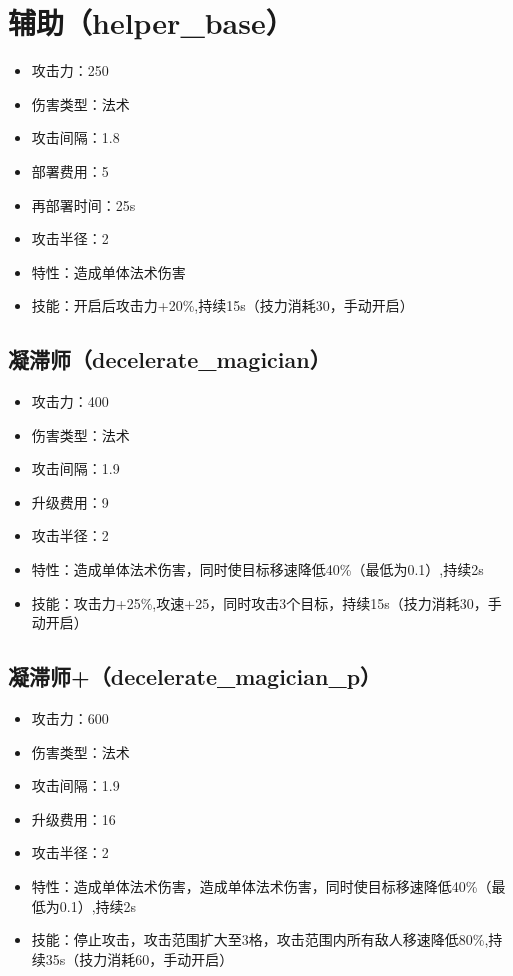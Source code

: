 \documentclass[a4paper,12pt]{article}
\begin{document}
	\section{辅助（helper\_base）}
		\begin{itemize}
			\item 攻击力：250
			\item 伤害类型：法术
			\item 攻击间隔：1.8
			\item 部署费用：5
			\item 再部署时间：25s
			\item 攻击半径：2
			\item 特性：造成单体法术伤害
			\item 技能：开启后攻击力+20\%,持续15s（技力消耗30，手动开启）
		\end{itemize}
		\subsection{凝滞师（decelerate\_magician）}
			\begin{itemize}
				\item 攻击力：400
				\item 伤害类型：法术
				\item 攻击间隔：1.9
				\item 升级费用：9
				\item 攻击半径：2
				\item 特性：造成单体法术伤害，同时使目标移速降低40\%（最低为0.1）,持续2s
				\item 技能：攻击力+25\%,攻速+25，同时攻击3个目标，持续15s（技力消耗30，手动开启）
			\end{itemize}
		\subsection{凝滞师+（decelerate\_magician\_p）}
			\begin{itemize}
				\item 攻击力：600
				\item 伤害类型：法术
				\item 攻击间隔：1.9
				\item 升级费用：16
				\item 攻击半径：2
				\item 特性：造成单体法术伤害，造成单体法术伤害，同时使目标移速降低40\%（最低为0.1）,持续2s
				\item 技能：停止攻击，攻击范围扩大至3格，攻击范围内所有敌人移速降低80\%,持续35s（技力消耗60，手动开启）
			\end{itemize}	
\end{document}

